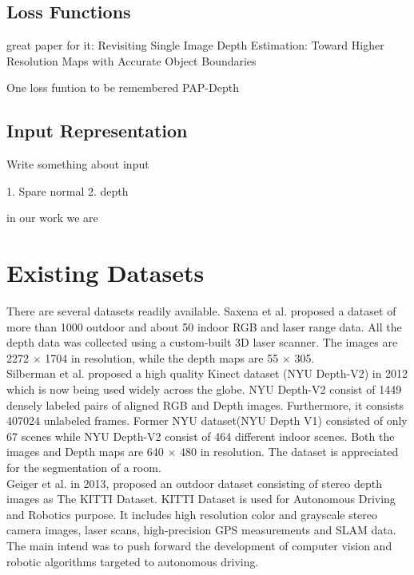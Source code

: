 \subsection{Loss Functions }
great paper for it: Revisiting Single Image Depth Estimation:
Toward Higher Resolution Maps with Accurate Object Boundaries \cite{hu2019revisiting}

One loss funtion to be remembered PAP-Depth \cite{PAP-Depth}




\subsection{Input Representation}
Write something about input

1. Spare normal 
2. depth

in our work we are 

\section{Existing Datasets}
There are several datasets readily available. Saxena et al. \cite{saxena2006learning} proposed a dataset of more than 1000 outdoor and about 50 indoor RGB and laser range data. All the depth data was collected using a custom-built 3D laser scanner. The images are 2272 $\times$ 1704 in resolution, while the depth maps are 55 $\times$ 305.\\

Silberman et al. \cite{Silberman:ECCV12} proposed a high quality Kinect dataset (NYU Depth-V2) in 2012 which is now being used widely across the globe. NYU Depth-V2 \cite{Silberman:ECCV12} consist of 1449 densely labeled pairs of aligned RGB and Depth images. Furthermore, it consists 407024 unlabeled frames. Former NYU dataset(NYU Depth V1) \cite{silberman11indoor} consisted of only 67 scenes while NYU Depth-V2 consist of 464 different indoor scenes. Both the images and Depth maps are 640 $\times$ 480 in resolution. The dataset is appreciated for the segmentation of a room.\\

Geiger et al. \cite{Geiger2013IJRR} in 2013, proposed an outdoor dataset consisting of stereo depth images as The KITTI Dataset. KITTI Dataset is used for Autonomous Driving and Robotics purpose. It includes high resolution color and grayscale stereo camera images, laser scans, high-precision GPS  measurements and SLAM data. The main intend was to push forward the development of computer vision and robotic algorithms targeted to autonomous driving.\\

